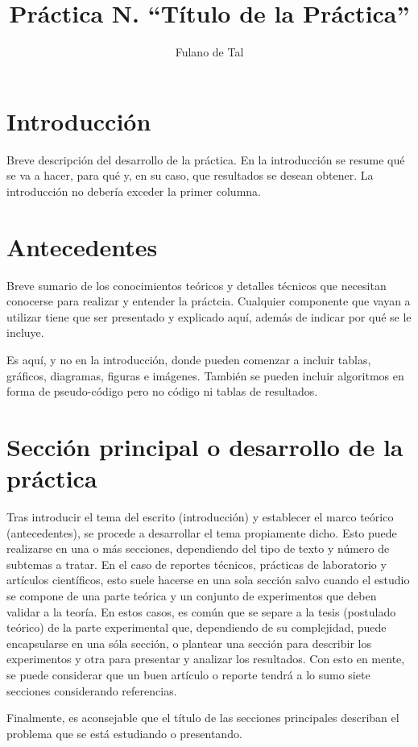\documentclass[letterpaper,10.5pt,twocolumn]{article}
\author{Fulano de Tal} %
\title{Práctica N. \enquote{Título de la Práctica}} %
\begin{document}
\maketitle

\section{Introducción}
\label{sec:intro}
Breve descripción del desarrollo de la práctica.
En la introducción se resume qué se va a hacer, para qué y, en su caso, que resultados se desean obtener.
La introducción no debería exceder la primer columna.

\section{Antecedentes}
\label{sec:background}
Breve sumario de los conocimientos teóricos y detalles técnicos que necesitan conocerse para realizar y entender la práctcia.
Cualquier componente que vayan a utilizar tiene que ser presentado y explicado aquí, además de indicar por qué se le incluye.

Es aquí, y no en la introducción, donde pueden comenzar a incluir tablas, gráficos, diagramas, figuras e imágenes.
También se pueden incluir algoritmos en forma de pseudo-código pero no código ni tablas de resultados.

\section{Sección principal o desarrollo de la práctica}
\label{sec:main}
Tras introducir el tema del escrito (introducción) y establecer el marco teórico (antecedentes), se procede a desarrollar el tema propiamente dicho.
Esto puede realizarse en una o más secciones, dependiendo del tipo de texto y número de subtemas a tratar.
En el caso de reportes técnicos, prácticas de laboratorio y artículos científicos, esto suele hacerse en una sola sección salvo cuando el estudio se compone de una parte teórica y un conjunto de experimentos que deben validar a la teoría.
En estos casos, es común que se separe a la tesis (postulado teórico) de la parte experimental que, dependiendo de su complejidad, puede encapsularse en una sóla sección, o plantear una sección para describir los experimentos y otra para presentar y analizar los resultados.
Con esto en mente, se puede considerar que un buen artículo o reporte tendrá a lo sumo siete secciones considerando referencias.

Finalmente, es aconsejable que el título de las secciones principales describan el problema que se está estudiando o presentando.
\end{document}
